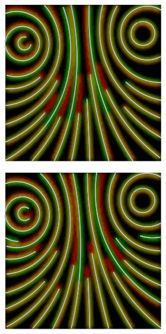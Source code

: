 \begin{figure}[ht]
\begin{subfigure}{\textwidth}
\begin{subfigure}{.19\textwidth}
        \end{subfigure}
        \begin{subfigure}{.19\textwidth}
            \centering
            \includegraphics[scale=.0515]{figures/AlphaStudy/Gyro13C.0003.png}
        \end{subfigure}
        \begin{subfigure}{.19\textwidth}
            \centering
            \includegraphics[scale=.0515]{figures/AlphaStudy/Gyro13C.0004.png}

\end{subfigure}
\end{subfigure}
\end{figure}
